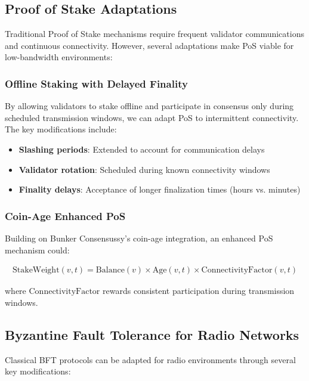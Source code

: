 \documentclass[11pt,a4paper]{article}
\begin{document}
\subsection{Proof of Stake Adaptations}

Traditional Proof of Stake mechanisms require frequent validator communications and continuous connectivity. However, several adaptations make PoS viable for low-bandwidth environments:

\subsubsection{Offline Staking with Delayed Finality}

By allowing validators to stake offline and participate in consensus only during scheduled transmission windows, we can adapt PoS to intermittent connectivity. The key modifications include:

\begin{itemize}
\item \textbf{Slashing periods}: Extended to account for communication delays
\item \textbf{Validator rotation}: Scheduled during known connectivity windows
\item \textbf{Finality delays}: Acceptance of longer finalization times (hours vs. minutes)
\end{itemize}

\subsubsection{Coin-Age Enhanced PoS}

Building on Bunker Consensussy's coin-age integration, an enhanced PoS mechanism could:

\begin{align}
\text{StakeWeight}(v, t) = \text{Balance}(v) \times \text{Age}(v, t) \times \text{ConnectivityFactor}(v, t)
\end{align}

where $\text{ConnectivityFactor}$ rewards consistent participation during transmission windows.

\subsection{Byzantine Fault Tolerance for Radio Networks}

Classical BFT protocols can be adapted for radio environments through several key modifications:
\end{document}
